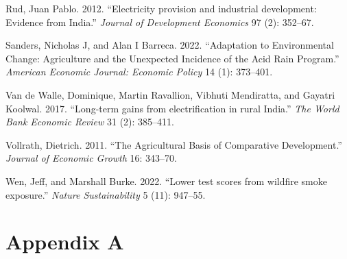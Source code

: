 \documentclass[
]{article}
\newlength{\cslhangindent}
\newlength{\cslentryspacingunit} %
\newenvironment{CSLReferences}[2] %
 {%
  \setlength{\parindent}{0pt}
  \ifodd #1
  \let\oldpar\par
  \def\par{\hangindent=\cslhangindent\oldpar}
  \fi
  \setlength{\parskip}{#2\cslentryspacingunit}
 }%
 {}
\newcommand{\beginappendix}{ \setcounter{table}{0} \renewcommand{\thetable}{A\arabic{table}} \setcounter{figure}{0} \renewcommand{\thefigure}{A\arabic{figure}} }
\begin{document}
\begin{CSLReferences}{1}{0}
\leavevmode{}%
Rud, Juan Pablo. 2012. {``{Electricity provision and industrial development: Evidence from India}.''} \emph{{Journal of Development Economics}} 97 (2): 352--67.

\leavevmode{}%
Sanders, Nicholas J, and Alan I Barreca. 2022. {``{Adaptation to Environmental Change: Agriculture and the Unexpected Incidence of the Acid Rain Program}.''} \emph{{American Economic Journal: Economic Policy}} 14 (1): 373--401.

\leavevmode{}%
Van de Walle, Dominique, Martin Ravallion, Vibhuti Mendiratta, and Gayatri Koolwal. 2017. {``{Long-term gains from electrification in rural India}.''} \emph{{The World Bank Economic Review}} 31 (2): 385--411.

\leavevmode{}%
Vollrath, Dietrich. 2011. {``The Agricultural Basis of Comparative Development.''} \emph{{Journal of Economic Growth}} 16: 343--70.

\leavevmode{}%
Wen, Jeff, and Marshall Burke. 2022. {``{Lower test scores from wildfire smoke exposure}.''} \emph{{Nature Sustainability}} 5 (11): 947--55.

\end{CSLReferences}

\FloatBarrier
\newpage

\hypertarget{appendix-a}{%
\section*{Appendix A}\label{appendix-a}}

\beginappendix
\FloatBarrier
\end{document}
